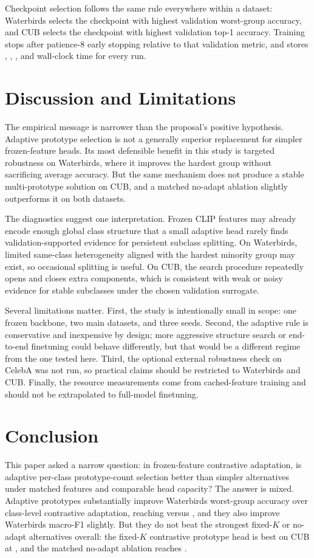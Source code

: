\documentclass[10pt,twocolumn]{article}
\begin{document}
Checkpoint selection follows the same rule everywhere within a dataset: Waterbirds selects the checkpoint with highest validation worst-group accuracy, and CUB selects the checkpoint with highest validation top-1 accuracy. Training stops after patience-$8$ early stopping relative to that validation metric, and  stores , , , and wall-clock time for every run.

\section{Discussion and Limitations}
\label{sec:discussion}
The empirical message is narrower than the proposal's positive hypothesis. Adaptive prototype selection is not a generally superior replacement for simpler frozen-feature heads. Its most defensible benefit in this study is targeted robustness on Waterbirds, where it improves the hardest group without sacrificing average accuracy. But the same mechanism does not produce a stable multi-prototype solution on CUB, and a matched no-adapt ablation slightly outperforms it on both datasets.

The diagnostics suggest one interpretation. Frozen CLIP features may already encode enough global class structure that a small adaptive head rarely finds validation-supported evidence for persistent subclass splitting. On Waterbirds, limited same-class heterogeneity aligned with the hardest minority group may exist, so occasional splitting is useful. On CUB, the search procedure repeatedly opens and closes extra components, which is consistent with weak or noisy evidence for stable subclasses under the chosen validation surrogate.

Several limitations matter. First, the study is intentionally small in scope: one frozen backbone, two main datasets, and three seeds. Second, the adaptive rule is conservative and inexpensive by design; more aggressive structure search or end-to-end finetuning could behave differently, but that would be a different regime from the one tested here. Third, the optional external robustness check on CelebA was not run, so practical claims should be restricted to Waterbirds and CUB. Finally, the resource measurements come from cached-feature training and should not be extrapolated to full-model finetuning.

\section{Conclusion}
\label{sec:conclusion}
This paper asked a narrow question: in frozen-feature contrastive adaptation, is adaptive per-class prototype-count selection better than simpler alternatives under matched features and comparable head capacity? The answer is mixed. Adaptive prototypes substantially improve Waterbirds worst-group accuracy over class-level contrastive adaptation, reaching \WbAdaptiveWorst{} versus \WbContrastiveWorst{}, and they also improve Waterbirds macro-F1 slightly. But they do not beat the strongest fixed-$K$ or no-adapt alternatives overall: the fixed-$K$ contrastive prototype head is best on CUB at \CubFixedKAcc{}, and the matched no-adapt ablation reaches \CubNoAdaptAcc{}.
\end{document}
